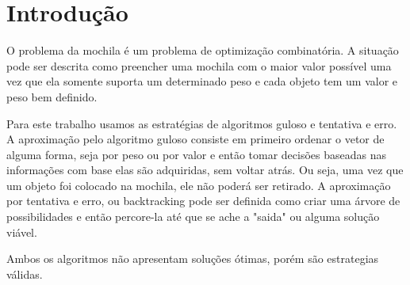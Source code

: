 \chapter[Introdução]{Introdução}
\label{cap:introducao}

O problema da mochila é um problema de optimização combinatória. A situação pode ser descrita como preencher uma mochila com o maior valor possível uma vez que ela somente suporta um determinado peso e cada objeto tem um valor e peso bem definido.

Para este trabalho usamos as estratégias de algoritmos guloso e tentativa e erro. A aproximação pelo algoritmo guloso consiste em primeiro ordenar o vetor de alguma forma, seja por peso ou por valor e então tomar decisões baseadas nas informações com base elas são adquiridas, sem voltar atrás. Ou seja, uma vez que um objeto foi colocado na mochila, ele não poderá ser retirado. A aproximação por tentativa e erro, ou backtracking pode ser definida como criar uma árvore de possibilidades e então percore-la até que se ache a "saida" ou alguma solução viável. 

Ambos os algoritmos não apresentam soluções ótimas, porém são estrategias válidas.

